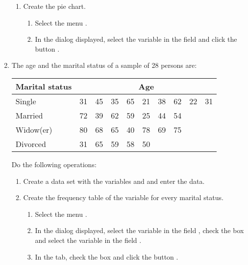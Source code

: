 \begin{enumerate}[leftmargin=*]
\begin{enumerate}
\item Create the pie chart.
\begin{indication}
\begin{enumerate}
\item Select the menu .
\item In the dialog displayed, select the variable  in the field  and click the
button .
\end{enumerate}
\end{indication}
\end{enumerate}

\item The age and the marital status of a sample of 28 persons are:
\begin{center}
\begin{tabular}{|l|rrrrrrrrr|}
\hline
Marital status & \multicolumn{9}{c|}{Age}\\
\hline
Single    & 31 & 45 & 35 & 65 & 21 & 38 & 62 & 22 & 31 \\
Married     & 72 & 39 & 62 & 59 & 25 & 44 & 54 &    &    \\
Widow(er)      & 80 & 68 & 65 & 40 & 78 & 69 & 75 &    &    \\
Divorced & 31 & 65 & 59 & 58 & 50 &    &    &    &    \\
\hline
\end{tabular}
\end{center}

Do the following operations:
\begin{enumerate}
\item Create a data set with the variables  and  and enter the data.
\item Create the frequency table of the variable  for every marital status.
\begin{indication}
\begin{enumerate}
\item Select the menu .
\item In the dialog displayed, select the variable  in the field , check the box  and select the variable  in the field
. 
\item In the  tab, check the box  and click the button .
\end{enumerate}
\end{indication}


\end{enumerate}
\end{enumerate}
